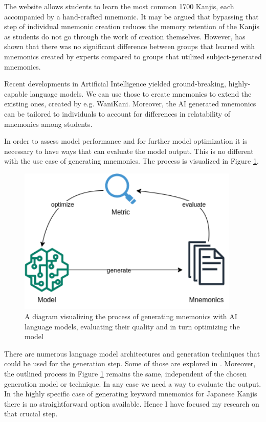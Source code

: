 The website allows students to learn the most common 1700 Kanjis, each accompanied by a hand-crafted mnemonic. It may be argued that bypassing that step of individual mnemonic creation reduces the memory retention of the Kanjis as students do not go through the work of creation themselves. However, \cite{campos_2004} has shown that there was no significant difference between groups that learned with mnemonics created by experts compared to groups that utilized subject-generated mnemonics.

Recent developments in Artificial Intelligence yielded ground-breaking, highly-capable language models. We can use those to create mnemonics to extend the existing ones, created by e.g. WaniKani. Moreover, the AI generated mnemonics can be tailored to individuals to account for differences in relatability of mnemonics among students. 

In order to assess model performance and for further model optimization it is necessary to have ways that can evaluate the model output. This is no different with the use case of generating mnemonics. The process is visualized in Figure \ref{figure:overall_process}.
\begin{figure}
    \centering
    \includegraphics[width=300pt]{resources/general.png}
    \caption{A diagram visualizing the process of generating mnemonics with AI language models, evaluating their quality and in turn optimizing the model}
    \label{figure:overall_process}
\end{figure}


There are numerous language model architectures and generation techniques that could be used for the generation step. Some of those are explored in \cite{radford2018improving, deepMnemonic2022}. Moreover, the outlined process in Figure \ref{figure:overall_process} remains the same, independent of the chosen generation model or technique. In any case we need a way to evaluate the output. In the highly specific case of generating keyword mnemonics for Japanese Kanjis there is no straightforward option available. Hence I have focused my research on that crucial step.  

